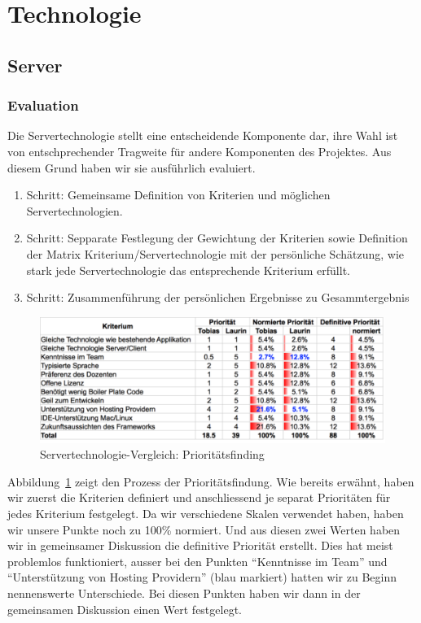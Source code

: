 \section{Technologie}
	\subsection{Server}

		\subsubsection{Evaluation}\label{serverEvaluation}
			Die Servertechnologie stellt eine entscheidende Komponente dar, 
			ihre Wahl ist von entschprechender Tragweite für andere Komponenten des Projektes.
			Aus diesem Grund haben wir sie ausführlich evaluiert.
			
			\begin{enumerate}
				\item Schritt: Gemeinsame Definition von Kriterien und möglichen Servertechnologien.
				\item Schritt: Sepparate Festlegung der Gewichtung der Kriterien sowie Definition der Matrix Kriterium/Servertechnologie mit der persönliche Schätzung, wie stark jede Servertechnologie das entsprechende Kriterium erfüllt.
				\item Schritt: Zusammenführung der persönlichen Ergebnisse zu Gesammtergebnis
			\end{enumerate}
		
			\begin{figure}[H]
				\begin{minipage}[b]{\linewidth}
					\includegraphics[width=\textwidth]{media/spreadsheets/ServertechnologieVergleichPrioritaetsfinding.pdf}
					\centering
					\caption{Servertechnologie-Vergleich: Prioritätsfinding}
					\label{fig:ServertechnologieVergleichPrioritaetsfinding}
				\end{minipage}
			\end{figure}
			
			Abbildung~\ref{fig:ServertechnologieVergleichPrioritaetsfinding} zeigt den Prozess der Prioritätsfindung.
			Wie bereits erwähnt, haben wir zuerst die Kriterien definiert und 
			anschliessend je separat Prioritäten für jedes Kriterium festgelegt.
			Da wir verschiedene Skalen verwendet haben, haben wir unsere Punkte noch zu 100\% normiert.
			Und aus diesen zwei Werten haben wir in gemeinsamer Diskussion die definitive Priorität erstellt.
			Dies hat meist problemlos funktioniert, ausser bei den Punkten "`Kenntnisse im Team"' und "`Unterstützung von Hosting Providern"' (blau markiert) hatten wir zu Beginn nennenswerte Unterschiede.
			Bei diesen Punkten haben wir dann in der gemeinsamen Diskussion einen Wert festgelegt.
		
